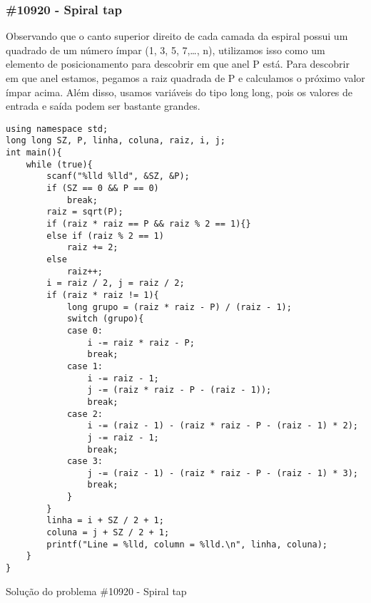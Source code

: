 \documentclass[a4paper,12pt]{scrartcl}
\begin{document}
\subsubsection{\#10920 - Spiral tap}
Observando que o canto superior direito de cada camada da espiral possui um quadrado de um número ímpar (1, 3, 5, 7,…, n), utilizamos isso como um elemento de posicionamento para descobrir em que anel P está. Para descobrir em que anel estamos, pegamos a raiz quadrada de P e calculamos o próximo valor ímpar acima. Além disso, usamos variáveis do tipo long long, pois os valores de entrada e saída podem ser bastante grandes.
\begin{listing}[H]
\begin{verbatim}
using namespace std;
long long SZ, P, linha, coluna, raiz, i, j;
int main(){
    while (true){
        scanf("%lld %lld", &SZ, &P);
        if (SZ == 0 && P == 0)
            break;
        raiz = sqrt(P);
        if (raiz * raiz == P && raiz % 2 == 1){}
        else if (raiz % 2 == 1)
            raiz += 2;
        else
            raiz++;
        i = raiz / 2, j = raiz / 2;
        if (raiz * raiz != 1){
            long grupo = (raiz * raiz - P) / (raiz - 1);
            switch (grupo){
            case 0:
                i -= raiz * raiz - P;
                break;
            case 1:
                i -= raiz - 1;
                j -= (raiz * raiz - P - (raiz - 1));
                break;
            case 2:
                i -= (raiz - 1) - (raiz * raiz - P - (raiz - 1) * 2);
                j -= raiz - 1;
                break;
            case 3:
                j -= (raiz - 1) - (raiz * raiz - P - (raiz - 1) * 3);
                break;
            }
        }
        linha = i + SZ / 2 + 1;
        coluna = j + SZ / 2 + 1;
        printf("Line = %lld, column = %lld.\n", linha, coluna);
    }
}
\end{verbatim}
\caption{\footnotesize{Solução do problema \#10920 - Spiral tap}}
\end{listing}
\newpage
\end{document}
